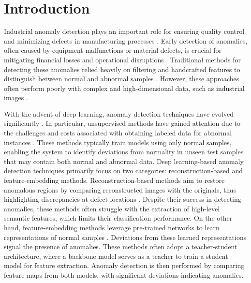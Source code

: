 \section*{Introduction}

Industrial anomaly detection \DIFaddbegin {}\DIFaddend plays an important role for ensuring quality control and minimizing defects in manufacturing processes \DIFdelbegin {}\DIFdelend \DIFaddbegin {}\DIFaddend . Early detection of anomalies, often caused by equipment malfunctions or material defects, is crucial for mitigating financial losses and operational disruptions \DIFaddbegin {}\DIFaddend . Traditional methods for detecting these anomalies relied heavily on filtering and handcrafted features to distinguish between normal and abnormal samples \cite{chandola2009anomaly}. However, these approaches often perform poorly with complex and high-dimensional data, such as industrial images \DIFaddbegin {}\DIFaddend .

With the advent of deep learning, anomaly detection techniques have evolved significantly \cite{tao2022deep, cui2023survey}. In particular, unsupervised methods have gained attention due to the challenges and costs associated with obtaining labeled data for abnormal instances \cite{cui2023survey}. These methods typically train models using only normal samples, enabling the system to identify deviations from normality in unseen test samples that may contain both normal and abnormal data. Deep learning-based anomaly detection techniques primarily focus on two categories: reconstruction-based and feature-embedding methods. Reconstruction-based methods aim to restore anomalous regions by comparing reconstructed images with the originals, thus highlighting discrepancies at defect locations \cite{akcay2019ganomaly, yu2023unsupervised, liu2020towards}. Despite their success in detecting anomalies, these methods often struggle with the extraction of high-level semantic features, which limits their classification performance. On the other hand, feature-embedding methods leverage pre-trained networks to learn representations of normal samples \cite{bergmann2020uninformed, salehi2021multiresolution, wang2021student, cao2022informative}. Deviations from these learned representations signal the presence of anomalies. These methods often adopt a teacher-student architecture, where a backbone model serves as a teacher to train a student model for feature extraction. Anomaly detection is then performed by comparing feature maps from both models, with significant deviations indicating anomalies.

